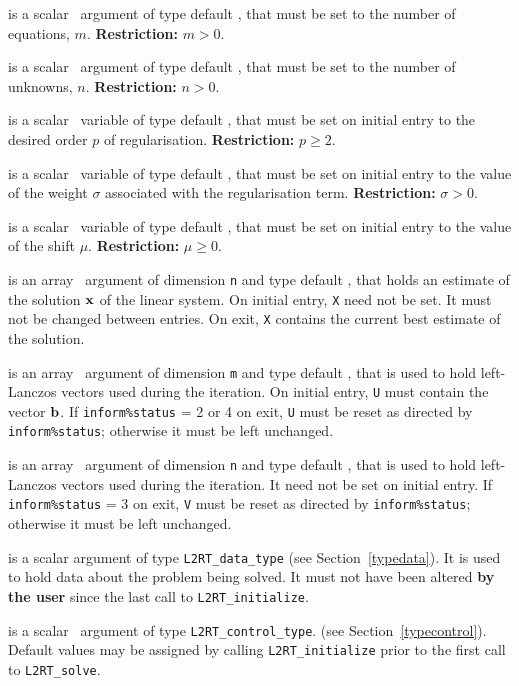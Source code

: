 \documentclass{galahad}
\newcommand{\packagename}{L2\-RT}
\begin{document}
\begin{description}

 is a scalar \intentin\ argument of type default \integer, that must be
set to the number of equations, $m$. {\bf Restriction: } $m > 0$.

 is a scalar \intentin\ argument of type default \integer, that must be
set to the number of unknowns, $n$. {\bf Restriction: } $n > 0$.

 is a scalar \intentin\ variable of type default
\realdp,
that must be set on initial entry to the desired order $p$ of regularisation.
{\bf Restriction: } $p \geq 2$.

 is a scalar \intentin\ variable of type default
\realdp,
that must be set on initial entry
to the value of the weight $\sigma$ associated with the regularisation term.
{\bf Restriction: } $\sigma > 0$.

 is a scalar \intentin\ variable of type default
\realdp,
that must be set on initial entry to the value of the shift $\mu$.
{\bf Restriction: } $\mu \geq 0$.

 is an array \intentinout\ argument of dimension {\tt n} and
type default \realdp,
that holds an estimate of the solution ${\mathbf{x}}$ of the linear system.
On initial entry, {\tt X} need not be set.
It must not be changed between entries.
On exit, {\tt X} contains the current best estimate of the solution.

 is an array \intentinout\ argument of dimension {\tt m} and
type default \realdp,
that is used to hold left-Lanczos vectors used during the iteration.
On initial entry, {\tt U} must contain the vector ${\mathbf{b}}$.
If {\tt inform\%status} = 2 or 4 on exit, {\tt U} must be reset
as directed by  {\tt inform\%status}; otherwise
it must be left unchanged.

 is an array \intentinout\ argument of dimension {\tt n} and
type default \realdp,
that is used to hold left-Lanczos vectors used during the iteration.
It need not be set on initial entry.
If {\tt inform\%status} = 3 on exit, {\tt V} must be reset
as directed by  {\tt inform\%status}; otherwise it must be left unchanged.

 is a scalar \intentinout argument of type
{\tt \packagename\_data\_type}
(see Section~\ref{typedata}). It is used to hold data about the problem being
solved. It must not have been altered {\bf by the user} since the last call to
{\tt \packagename\_initialize}.

 is a scalar \intentin\ argument of type
{\tt \packagename\_control\_type}.
(see Section~\ref{typecontrol}).
Default values may be assigned by calling {\tt \packagename\_initialize}
prior to the first call to {\tt \packagename\_solve}.


\end{description}
\end{document}
